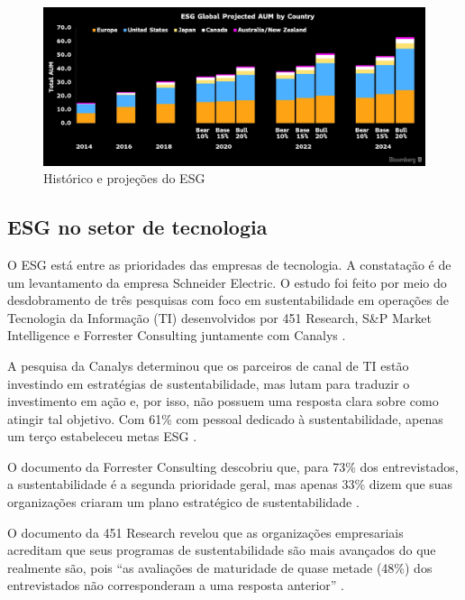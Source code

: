 \documentclass[12pt]{article}
\begin{document}
	\begin{figure}[h]
		\centering
		\includegraphics[scale=0.2]{pictures/esg-projections.png}
		\caption{Histórico e projeções do ESG}
		\label{fig:projections}
	\end{figure}
	
	\subsection*{ESG no setor de tecnologia}
	
	O ESG está entre as prioridades das empresas de tecnologia. A constatação é de um levantamento da empresa Schneider Electric. O estudo foi feito por meio do desdobramento de três pesquisas com foco em sustentabilidade em operações de Tecnologia da Informação (TI) desenvolvidos por 451 Research, S\&P Market Intelligence e Forrester Consulting juntamente com Canalys \cite{paceteESGPrioridadePara2022}.
	
	A pesquisa da Canalys determinou que os parceiros de canal de TI estão investindo em estratégias de sustentabilidade, mas lutam para traduzir o investimento em ação e, por isso, não possuem uma resposta clara sobre como atingir tal objetivo. Com 61\% com pessoal dedicado à sustentabilidade, apenas um terço estabeleceu metas ESG \cite{paceteESGPrioridadePara2022}.
	
	O documento da Forrester Consulting descobriu que, para 73\% dos entrevistados, a sustentabilidade é a segunda prioridade geral, mas apenas 33\% dizem que suas organizações criaram um plano estratégico de sustentabilidade \cite{paceteESGPrioridadePara2022}.
	
	O documento da 451 Research revelou que as organizações empresariais acreditam que seus programas de sustentabilidade são mais avançados do que realmente são, pois “as avaliações de maturidade de quase metade (48\%) dos entrevistados não corresponderam a uma resposta anterior” \cite{paceteESGPrioridadePara2022}.
	
\end{document}
